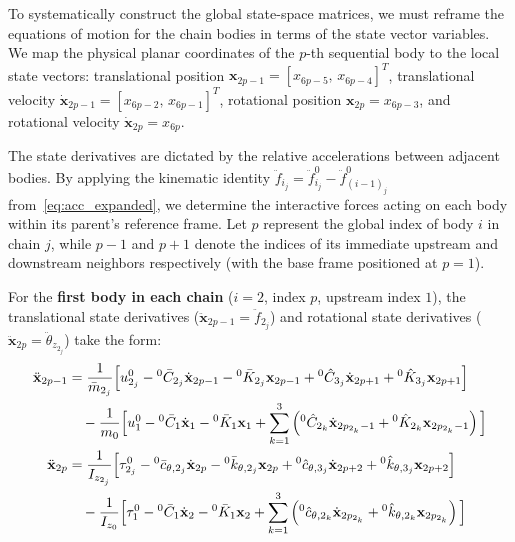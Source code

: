 To systematically construct the global state-space matrices, we must reframe the equations of motion for the chain bodies in terms of the state vector variables. We map the physical planar coordinates of the $p$-th sequential body to the local state vectors: translational position $\mathbf{x}_{2p-1} = [x_{6p-5},\, x_{6p-4}]^T$, translational velocity $\dot{\mathbf{x}}_{2p-1} = [x_{6p-2},\, x_{6p-1}]^T$, rotational position $\mathbf{x}_{2p} = x_{6p-3}$, and rotational velocity $\dot{\mathbf{x}}_{2p} = x_{6p}$.

The state derivatives are dictated by the relative accelerations between adjacent bodies. By applying the kinematic identity $\ddot{f}_{i_j} = \ddot{f}^0_{i_j} - \ddot{f}^0_{(i-1)_j}$ from~\eqref{eq:acc_expanded}, we determine the interactive forces acting on each body within its parent's reference frame. Let $p$ represent the global index of body $i$ in chain $j$, while $p-1$ and $p+1$ denote the indices of its immediate upstream and downstream neighbors respectively (with the base frame positioned at $p=1$).


For the \textbf{first body in each chain} ($i=2$, index $p$, upstream index $1$), the translational state derivatives ($\ddot{\mathbf{x}}_{2p-1} = \ddot{f}_{2_j}$) and rotational state derivatives ($\ddot{\mathbf{x}}_{2p} = \ddot{\theta}_{z_{2_j}}$) take the form:
\begin{align}
    \ddot{\mathbf{x}}_{2p-1} &= 
    \frac{1}{\bar{m}_{2_j}} \Big[ u^0_{2_j} - {}^0\bar{C}_{2_j}\dot{\mathbf{x}}_{2p-1} - {}^0\bar{K}_{2_j}\mathbf{x}_{2p-1} + {}^0\hat{C}_{3_j}\dot{\mathbf{x}}_{2p+1} + {}^0\hat{K}_{3_j}\mathbf{x}_{2p+1} \Big] \notag \\
    &\quad - \frac{1}{m_0} \Big[ u^0_1 - {}^0\bar{C}_1\dot{\mathbf{x}}_{1} - {}^0\bar{K}_1 \mathbf{x}_{1} + \sum_{k=1}^3 \left( {}^0\hat{C}_{2_k}\dot{\mathbf{x}}_{2p_{2_k}-1} + {}^0\hat{K}_{2_k}\mathbf{x}_{2p_{2_k}-1} \right) \Big] \\
    \ddot{\mathbf{x}}_{2p} &= 
    \frac{1}{I_{z_{2_j}}} \Big[ \tau^0_{2_j} - {}^0\bar{c}_{\theta,2_j}\dot{\mathbf{x}}_{2p} - {}^0\bar{k}_{\theta,2_j}\mathbf{x}_{2p} + {}^0\hat{c}_{\theta,3_j}\dot{\mathbf{x}}_{2p+2} + {}^0\hat{k}_{\theta,3_j}\mathbf{x}_{2p+2} \Big] \notag \\
    &\quad - \frac{1}{I_{z_0}} \Big[ \tau^0_1 - {}^0\bar{C}_1\dot{\mathbf{x}}_{2} - {}^0\bar{K}_1 \mathbf{x}_{2} + \sum_{k=1}^3 \left( {}^0\hat{c}_{\theta,2_k}\dot{\mathbf{x}}_{2p_{2_k}} + {}^0\hat{k}_{\theta,2_k}\mathbf{x}_{2p_{2_k}} \right) \Big]
\end{align}

